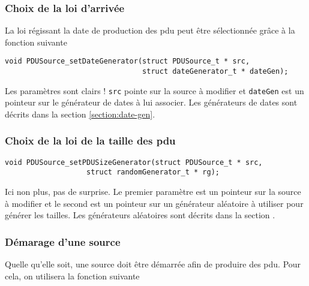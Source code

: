 %
\subsubsection{Choix de la loi d'arrivée}

   La loi régissant la date de production des {\sc pdu} peut être
sélectionnée grâce à la fonction suivante

\begin{verbatim}
void PDUSource_setDateGenerator(struct PDUSource_t * src,
                                struct dateGenerator_t * dateGen);
\end{verbatim}

   Les paramètres sont clairs ! {\tt src} pointe sur la source à
modifier et {\tt dateGen} est un pointeur sur le générateur de dates à
lui associer. Les générateurs de dates sont décrits dans la section
\ref{section:date-gen}.

%
\subsubsection{Choix de la loi de la taille des {\sc pdu}}

\begin{verbatim}
void PDUSource_setPDUSizeGenerator(struct PDUSource_t * src,
				   struct randomGenerator_t * rg);
\end{verbatim}

   Ici non plus, pas de surprise. Le premier paramètre est un pointeur
sur la source à modifier et le second est un pointeur sur un
générateur aléatoire à utiliser pour générer les tailles. Les
générateurs aléatoires sont décrits dans la section
\cite{section:rand-gen}.

%
\subsubsection{Démarage d'une source}

   Quelle qu'elle soit, une source doit être démarrée afin de produire
des {\sc pdu}. Pour cela, on utilisera la fonction suivante

